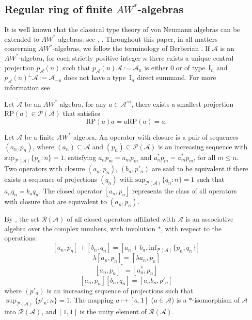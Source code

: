 \documentclass[12pt]{amsart}
\theoremstyle{definition}
\theoremstyle{remark}
\numberwithin{equation}{section}
\begin{document}
\subsection{Regular ring of  finite $AW^*$-algebras} It is well known that  the classical type theory of von Neumann algebras can  be extended to $AW^*$-algebras; see \cite{Berberian}, \cite{Saito-wright}.  Throughout this paper, in all matters concerning $AW^*$-algebras, we follow the terminology of Berberian \cite{Berberian}. If $\mathcal{A}$ is an $AW^*$-algebra,  for each strictly positive integer $n$ there exists a unique central projection $p_\mathcal{A}(n)$  such that $p_\mathcal{A}(n)\mathcal{A}:=\mathcal{A}_n$ is either $0$ or of type~$\mathrm{I}_n$ and  $p_{\mathcal{A}}(n)^{\perp}\mathcal{A}:=\mathcal{A}_{-n}$ does not have a type~$\mathrm{I}_n$ direct summand. For more information see \cite[Theorems~3, p. 94; 4, p. 116]{Berberian}.
 
Let  $\mathcal{A}$ be an  $AW^*$-algebra, for  any  $a\in \mathcal{A}^{sa}$, there exists a smallest projection $   \mathrm{RP}(a)\in \mathcal{P(A)}$  that satisfies $$  \mathrm{RP}(a)a=a  \mathrm{RP}(a)=a.$$



Let $\mathcal{A}$ be a finite $AW^*$-algebra. An operator with closure is a pair of sequences $(a_n, p_n)$, where $(a_n) \subseteq \mathcal{A}$ and $(p_n)\subseteq\mathcal{P(A)}$ is an increasing sequence  with  $\mathrm{sup}_{\mathcal{P(A)}}\{p_n: n\}=1$, satisfying $a_n p_m = a_m p_m$ and $a_n^* p_m = a_m^* p_m$, for all $m \leq n$. Two operators with closure $(a_n,p_n)$, $(b_n,p'_n)$ are said to be equivalent if there exists a sequence of projections $(q_n)$ with $\mathrm{sup}_{\mathcal{P(A)}}\{q_n: n\}=1$ such that $a_n q_n = b_n q_n$.
The closed operator $[a_n,p_n]$ represents the class of all operators with closure that are equivalent to $(a_n,p_n)$. 

By \cite[Theorem 2.1]{Berberian1}, the set \(\mathcal{R(A)}\) of all closed operators affiliated with $\mathcal{A}$ is an associative algebra over the complex numbers, with involution \(*\), with respect to the operations:
$$[a_n, p_n] + [b_n, q_n] = [a_n + b_n,  \mathrm{inf}_{\mathcal{P(A)}}\{p_n,q_n\}]$$
$$
\lambda [a_n, p_n] = [\lambda a_n, p_n]
$$
$$
[a_n, p_n]^* = [a_n^*, p_n]$$
$$[a_n, p_n][b_n, q_n] = [a_n b_n, p'_n]$$
where $(p'_n)$ is an increasing sequence of projections such that $\sup_{\mathcal{P(A)}}\{p'_n: n\}=1$. The mapping $a \mapsto [a, 1]$ ($a \in \mathcal{A}$) is a \(*\)-isomorphism of $\mathcal{A}$ into $\mathcal{R(A)}$, and $[1, 1]$ is the  unity element of $\mathcal{R(A)}$.
\end{document}
